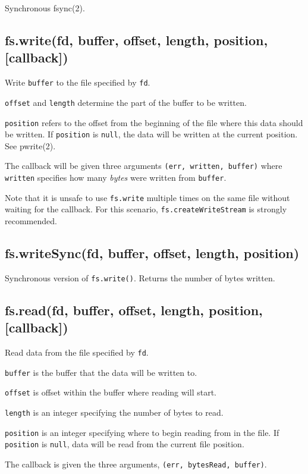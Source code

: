 Synchronous fsync(2).

\subsection{fs.write(fd, buffer, offset, length, position,
{[}callback{]})}

Write \texttt{buffer} to the file specified by \texttt{fd}.

\texttt{offset} and \texttt{length} determine the part of the buffer to
be written.

\texttt{position} refers to the offset from the beginning of the file
where this data should be written. If \texttt{position} is
\texttt{null}, the data will be written at the current position. See
pwrite(2).

The callback will be given three arguments
\texttt{(err, written, buffer)} where \texttt{written} specifies how
many \emph{bytes} were written from \texttt{buffer}.

Note that it is unsafe to use \texttt{fs.write} multiple times on the
same file without waiting for the callback. For this scenario,
\texttt{fs.createWriteStream} is strongly recommended.

\subsection{fs.writeSync(fd, buffer, offset, length, position)}

Synchronous version of \texttt{fs.write()}. Returns the number of bytes
written.

\subsection{fs.read(fd, buffer, offset, length, position,
{[}callback{]})}

Read data from the file specified by \texttt{fd}.

\texttt{buffer} is the buffer that the data will be written to.

\texttt{offset} is offset within the buffer where reading will start.

\texttt{length} is an integer specifying the number of bytes to read.

\texttt{position} is an integer specifying where to begin reading from
in the file. If \texttt{position} is \texttt{null}, data will be read
from the current file position.

The callback is given the three arguments,
\texttt{(err, bytesRead, buffer)}.

